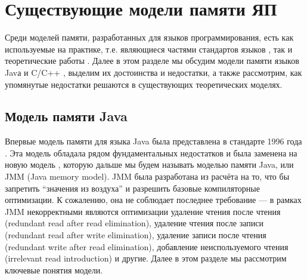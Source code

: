 





\section{Существующие модели памяти ЯП}
Среди моделей памяти, разработанных для языков программирования, есть как используемые на практике,
т.е. являющиеся частями стандартов языков \cite{Gosling-al:BOOK96,JavaStandard,C:11,CPP:11}, так и теоретические работы
\cite{Crary-Sullivan:POPL15,Lamport:TC79,Boudol-al:EXPRESS12,Boudol-Petri:POPL09,PichonPharabod-Sewell:POPL16,Jeffrey-Riely:LICS16}.
Далее в этом разделе мы обсудим модели памяти языков Javа \cite{JavaStandard} и C/C++ \cite{C:11,CPP:11},
выделим их достоинства и недостатки, а также рассмотрим, как упомянутые недостатки решаются в существующих
теоретических моделях.

\subsection{Модель памяти Java}
Впервые модель памяти для языка Java была представлена в стандарте 1996 года \cite{Gosling-al:BOOK96}.
Эта модель обладала рядом фундаментальных недостатков \cite{Pugh:JAVA99,Pugh:CPE00} и была заменена на
новую модель \cite{Manson-al:POPL05}, которую дальше мы будем называть моделью памяти Java, или JMM (Java memory model).
JMM была разработана из расчёта на то, что бы запретить ``значения из воздуха'' и разрешить базовые компиляторные оптимизации.
К сожалению, она не соблюдает последнее требование \cite{Sevcik-Aspinall:ECOOP08} ---
в рамках JMM некорректными являются оптимизации удаление чтения после чтения (redundant read after read elimination),
удаление чтения после записи (redundant read after write elimination),
удаление записи после чтения (redundant write after read elimination),
добавление неиспользуемого чтения (irrelevant read introduction) и другие.
Далее в этом разделе мы рассмотрим ключевые понятия модели.


